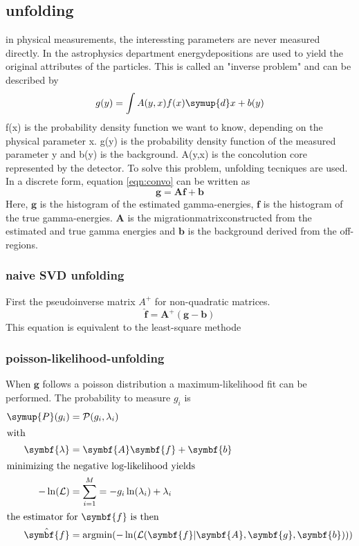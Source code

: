 \subsection{unfolding}
in physical measurements, the interessting parameters are never measured directly. In the astrophysics department energydepositions are used to yield the original attributes of the particles. This is called an "inverse problem" and can be described by
\begin{equation}
  g(y) = \int A(y,x) f(x) \symup{d}x + b(y)
  \label{eqn:convo}
\end{equation}
f(x) is the probability density function we want to know, depending on the physical parameter x. g(y) is the probability density function of the measured parameter y and b(y) is the background. A(y,x) is the concolution core represented by the detector.
To solve this problem, unfolding tecniques are used.
In a discrete form, equation \eqref{eqn:convo} can be written as
\begin{equation}
  \symbf{g} = \symbf{A}\symbf{f} + \symbf{b}
\end{equation}
Here, $\symbf{g}$ is the histogram of the estimated gamma-energies, $\symbf{f}$ is the histogram of the true gamma-energies.
$\symbf{A}$ is the migrationmatrixconstructed from the estimated and true gamma energies and $\symbf{b}$ is the background derived from the off-regions.

\subsubsection{naive SVD unfolding}
First the pseudoinverse matrix $A^{+}$ for non-quadratic matrices.
\begin{equation}
  \hat{\symbf{f}} = \symbf{A}^{+}(\symbf{g} - \symbf{b})
\end{equation}
This equation is equivalent to the least-square methode

\subsubsection{poisson-likelihood-unfolding}
When $\symbf{g}$ follows a poisson distribution a maximum-likelihood fit can be performed.
The probability to measure $g_i$ is
\begin{align}
  \symup{P}(g_i) &= \mathcal{P}(g_i, \lambda_i) \\
  \shortintertext{with}
  \symbf{\lambda} &= \symbf{A}\symbf{f} + \symbf{b} \\
  \intertext{minimizing the negative log-likelihood yields}
  -\ln(\mathcal{L}) &= \sum_{i=1}^{M} = -g_i \ln(\lambda_i) + \lambda_i \\
  \intertext{the estimator for $\symbf{f}$ is then}
  \hat{\symbf{f}} &= \text{argmin}(-\ln(\mathcal{L}(\symbf{f}|\symbf{A},\symbf{g},\symbf{b})))
\end{align}
